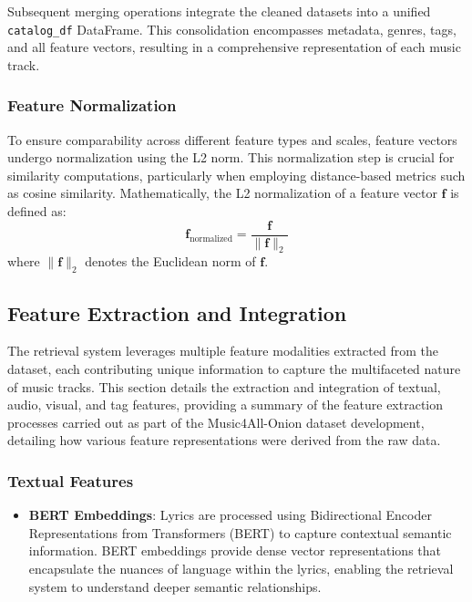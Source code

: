 \documentclass[sigconf]{acmart}
\begin{document}
Subsequent merging operations integrate the cleaned datasets into a unified \texttt{catalog\_df} DataFrame. This consolidation encompasses metadata, genres, tags, and all feature vectors, resulting in a comprehensive representation of each music track.

\subsubsection{Feature Normalization}

To ensure comparability across different feature types and scales, feature vectors undergo normalization using the L2 norm. This normalization step is crucial for similarity computations, particularly when employing distance-based metrics such as cosine similarity. Mathematically, the L2 normalization of a feature vector \( \mathbf{f} \) is defined as:
\[
\mathbf{f}_{\text{normalized}} = \frac{\mathbf{f}}{\|\mathbf{f}\|_2}
\]
where \( \|\mathbf{f}\|_2 \) denotes the Euclidean norm of \( \mathbf{f} \).

\subsection{Feature Extraction and Integration}
\label{subsec:feature_extraction_integration}

The retrieval system leverages multiple feature modalities extracted from the dataset, each contributing unique information to capture the multifaceted nature of music tracks. This section details the extraction and integration of textual, audio, visual, and tag features, providing a summary of the feature extraction processes carried out as part of the Music4All-Onion dataset development, detailing how various feature representations were derived from the raw data.


\subsubsection{Textual Features}

\begin{itemize}
    \item \textbf{BERT Embeddings}: Lyrics are processed using Bidirectional Encoder Representations from Transformers (BERT) to capture contextual semantic information. BERT embeddings provide dense vector representations that encapsulate the nuances of language within the lyrics, enabling the retrieval system to understand deeper semantic relationships.
\end{itemize}
\end{document}
